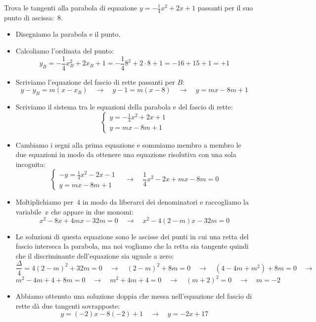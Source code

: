 \begin{esempio}
 Trova le tangenti alla parabola di equazione \(y=-\frac{1}{4}x^2+2x +1\) 
 passanti per il suo punto di ascissa:~\(8\).
 
 \begin{itemize}
  \item Disegniamo la parabola e il punto.
  \item Calcoliamo l'ordinata del punto:
\[y_B=-\frac{1}{4}x_B^2+2x_B+1=-\frac{1}{4}8^2+2 \cdot 8+1= -16+15+1=+1\]
  \item Scriviamo l'equazione del fascio di rette passanti per \(B\):
\[y-y_B = m(x-x_B) \quad \rightarrow \quad 
y-1 = m\left(x-8\right)
\quad \rightarrow \quad y=mx-8m+1\]
  \item Scriviamo il sistema tra le equazioni della parabola e del fascio di 
   rette:
\[\left\{\begin{array}{l}
  y=-\frac{1}{4}x^2+2x +1\\
  y=mx-8m+1
\end{array}\right. \]
  \item Cambiamo i segni alla prima equazione e sommiamo membro a membro le
   due equazioni in modo da ottenere una equazione risolutiva con una sola 
   incognita:
\[\left\{\begin{array}{l}
  -y=\frac{1}{4}x^2-2x-1\\
  y=mx-8m+1
\end{array}\right. \quad \rightarrow \quad 
\frac{1}{4}x^2-2x+mx-8m=0\]
  \item Moltiplichiamo per~\(4\) in modo da liberarci dei denominatori e 
   raccogliamo la variabile~\(x\) che appare in due monomi:
\[x^2-8x+4mx-32m=0 \quad \rightarrow \quad x^2-4(2-m)x-32m=0\]
  \item Le soluzioni di questa equazione sono le ascisse dei punti in cui una 
   retta del fascio interseca la parabola, ma noi vogliamo che la retta sia
   tangente quindi che il discriminante dell'equazione sia uguale a zero:
\[\frac{\Delta}{4}=4(2-m)^2+32m=0 \quad \rightarrow \quad 
(2-m)^2+8m=0 \quad \rightarrow \quad
(4-4m+m^2)+8m=0 \quad \rightarrow \quad\]
\[m^2-4m+4+8m=0 \quad \rightarrow \quad
m^2+4m+4=0 \quad \rightarrow \quad
(m+2)^2=0  \quad \rightarrow \quad m=-2\]
  \item Abbiamo ottenuto una soluzione doppia che messa nell'equazione del 
   fascio di rette dà due tangenti sovrapposte:
\[y=(-2)x-8(-2)+1 \quad \rightarrow \quad y=-2x+17\]
 \end{itemize}
\end{esempio}

